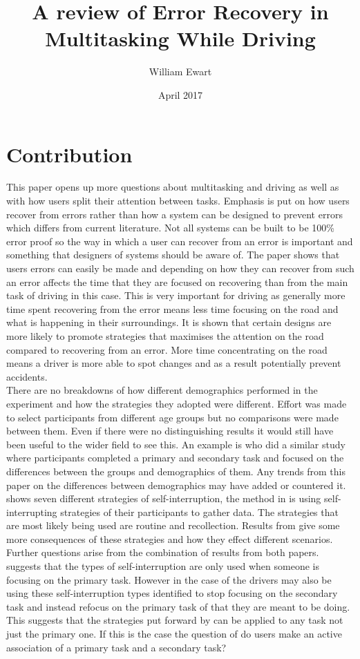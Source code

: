 \documentclass[12pt]{article}
\title{A review of Error Recovery in Multitasking While Driving}
\author{William Ewart}
\date{April 2017}
\begin{document}
\begin{titlingpage}
\maketitle
\tableofcontents
\end{titlingpage}
\newpage

\section{Contribution}
This paper opens up more questions about multitasking and driving as well as with how users split their attention between tasks. Emphasis is put on how users recover from errors rather than how a system can be designed to prevent errors which differs from current literature. Not all systems can be built to be 100\% error proof so the way in which a user can recover from an error is important and something that designers of systems should be aware of. The paper shows that users errors can easily be made and depending on how they can recover from such an error affects the time that they are focused on recovering than from the main task of driving in this case. This is very important for driving as generally more time spent recovering from the error means less time focusing on the road and what is happening in their surroundings. It is  shown that certain designs are more likely to promote strategies that maximises the attention on the road compared to recovering from an error. More time concentrating on the road means a driver is more able to spot changes and as a result potentially prevent accidents. \\
There are no breakdowns of how different demographics performed in the experiment and how the strategies they adopted were different. Effort was made to select participants from different age groups but no comparisons were made between them. Even if there were no distinguishing results it would still have been useful to the wider field to see this. An example is \cite{Janssen} who did a similar study where participants completed a primary and secondary task and focused on the differences between the groups and demographics of them. Any trends from this paper on the differences between demographics may have added or countered it. \\
\cite{Jin} shows seven different strategies of self-interruption, the method in \cite{Lee} is using self-interrupting strategies of their participants to gather data. The strategies that are most likely being used are routine and recollection. Results from \cite{Lee} give some more consequences of these strategies and how they effect different scenarios. Further questions arise from the combination of results from both papers. \cite{Jin} suggests that the types of self-interruption are only used when someone is focusing on the primary task. However in the case of \cite{Lee} the drivers may also be using these self-interruption types identified to stop focusing on the secondary task and instead refocus on the primary task of that they are meant to be doing. This suggests that the strategies put forward by \cite{Jin} can be applied to any task not just the primary one. If this is the case the question of do users make an active association of a primary task and a secondary task?
\end{document}
